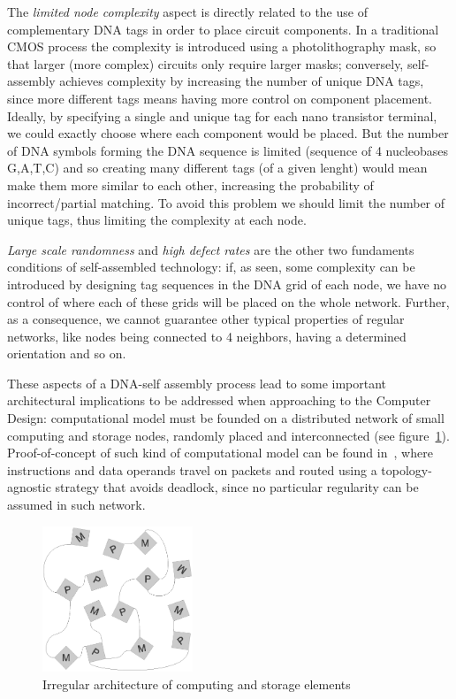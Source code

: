 The \emph{limited node complexity} aspect is directly
related to the use of complementary DNA tags in order to place circuit
components. In a traditional CMOS process the complexity is introduced
using a photolithography mask, so that larger (more complex) circuits
only require larger masks; conversely, self-assembly achieves
complexity by increasing the number of unique DNA tags, since more
different tags means having more control on component placement. Ideally, by specifying a single
and unique tag for each nano transistor terminal, we could exactly
choose where each component would be placed. But the number of DNA
symbols forming the DNA sequence is limited (sequence of 4 nucleobases
G,A,T,C) and so creating many different tags (of a given lenght) would
mean make them more similar to each other, increasing the probability
of incorrect/partial matching. To avoid this problem we should limit
the number of unique tags, thus limiting the complexity at each node. 

\emph{Large scale randomness} and \emph{high defect rates} are the other two fundaments
conditions of self-assembled technology: if, as seen, some complexity
can be introduced by designing tag sequences in the DNA grid of each
node, we have no control of where each of these grids will be placed
on the whole network. Further, as a consequence, we cannot guarantee
other typical properties of regular networks, like nodes being
connected to 4 neighbors, having a determined orientation and so on.

These aspects of a DNA-self assembly process lead to some important
architectural implications to be addressed when approaching to the
Computer Design: computational model must be founded on a distributed
network of small computing and storage nodes, randomly placed and
interconnected (see figure~\ref{fig:nana}).  Proof-of-concept of such kind of computational model
can be found in~\cite{TODO6}, where instructions and data operands travel
on packets and routed using a topology-agnostic strategy that avoids
deadlock, since no particular regularity can be assumed in such
network. 

\begin{figure}
  \centering
    \includegraphics[width=0.40\textwidth]{pictures/dna1.eps}
  \caption{Irregular architecture of computing and storage elements}
  \label{fig:nana}
\end{figure}

